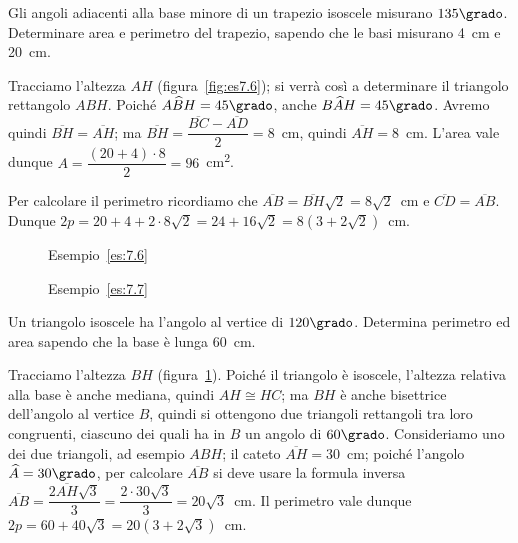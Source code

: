 \begin{exrig}
\begin{esempio}\label{es:7.6}
Gli angoli adiacenti alla base minore di un trapezio isoscele 
misurano \(135\grado\). Determinare area e perimetro del trapezio, 
sapendo che le basi misurano 4~cm e 20~cm.\vspace{7pt}

Tracciamo l'altezza \(AH\) (figura~\ref{fig:es7.6}); si verrà così a 
determinare il triangolo rettangolo \(ABH\). Poiché 
\(A\widehat{B}H=45\grado\), anche \(B\widehat{A}H=45\grado\). Avremo 
quindi \(\overline{BH}=\overline{AH}\); ma 
\(\overline{BH}=\dfrac{\overline{BC}-\overline{AD}}{2}=8\)~cm, quindi 
\(\overline{AH}=8\)~cm. L'area vale dunque \(A=\dfrac{(20+4)\cdot 
8}{2}=96\)~cm\textsuperscript{2}.

Per calcolare il perimetro ricordiamo che 
\(\overline{AB}=\overline{BH}\sqrt{2}=8\sqrt{2}\)~cm e 
\(\overline{CD}=\overline{AB}\).
Dunque \(2p=20+4+2\cdot 8\sqrt{2}=24+16\sqrt{2}=8(3+2\sqrt{2})\)~cm.
\end{esempio}


\begin{inaccessibleblock}
 \begin{figure}[!htb]
	\begin{center}
		\begin{minipage}{0.45\textwidth}
			\centering
			
			
\caption{Esempio~\ref{es:7.6}}\label{fig:es7.6}
		\end{minipage}
		\hspace{0.03\textwidth}	
		\begin{minipage}{0.45\textwidth}
			\centering
			
			
\caption{Esempio~\ref{es:7.7}}\label{fig:es7.7}
		\end{minipage}
	\end{center}
\end{figure}
\end{inaccessibleblock}

\begin{esempio}\label{es:7.7}
Un triangolo isoscele ha l'angolo al vertice di \(120\grado\). 
Determina perimetro ed area sapendo che la base è lunga 
60~cm.\vspace{7pt}

Tracciamo l'altezza \(BH\) (figura~\ref{fig:es7.7}). Poiché il 
triangolo è isoscele, l'altezza relativa alla base è anche mediana, 
quindi \(AH\cong HC\); ma \(BH\) è anche bisettrice dell'angolo al vertice 
\(B\), quindi si ottengono due triangoli rettangoli tra loro 
congruenti, ciascuno dei quali ha in \(B\) un angolo di \(60\grado\). 
Consideriamo uno dei due triangoli, ad esempio \(ABH\); il cateto 
\(\overline{AH}=30\)~cm; poiché l'angolo \(\widehat{A}=30\grado\), per 
calcolare \(\overline{AB}\) si deve usare la formula inversa 
\(\overline{AB}=\dfrac{2\overline{AH}\sqrt{3}}{3}=\dfrac{2\cdot 
30\sqrt{3}}{3}=20\sqrt{3}\)~cm.
Il perimetro vale dunque \(2p=60 + 40\sqrt{3} = 20 (3 + 2\sqrt{3})\)~cm.


\end{esempio}
\end{exrig}

